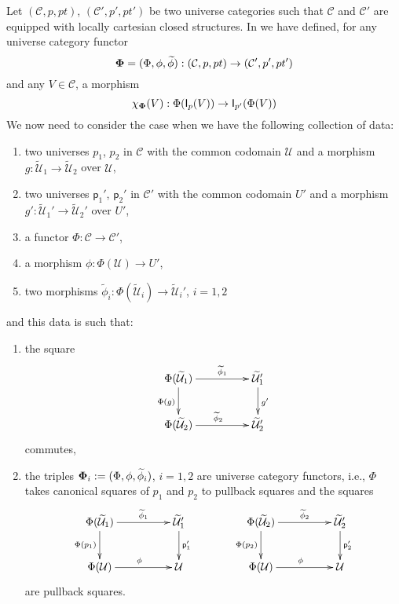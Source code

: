 \documentclass[12pt]{article}
\numberwithin{equation}{section}
\newcommand{\sr}{\rightarrow}
\newcommand{\wt}{\widetilde}
\newcommand{\spc}{{\,\,\,\,\,\,\,}}
\newcommand{\C}{{\mathcal C}}  %
\newcommand{\p}{\mathsf{p}}
\newcommand{\U}{\mathcal{U}}
\newcommand{\I}{\mathsf{I}}
\begin{document}
Let $({\C},p,pt)$, $({\C}',p',pt')$ be two universe categories
such that $\C$ and $\C'$ are equipped with locally cartesian
closed structures. In \cite[Construction 5.6]{fromunivwithPi} we have defined,
for any universe category functor
%
$${\bf\Phi}=(\Phi,\phi,\wt{\phi}):({\C},p,pt)\sr ({\mathcal
  C}',p',pt')$$
%
and any $V\in {\C}$, a morphism
%
$$\chi_{\bf\Phi}(V):\Phi(\I_p(V))\sr \I_{p'}(\Phi(V))$$
%
We now need to consider the case when we have the following collection of data:
%
\begin{enumerate}
\item two universes $p_1$, $p_2$ in $\C$ with the common codomain $\U$
  and a morphism $g:\wt{\U}_1\sr \wt{\U}_2$ over $\U$,
\item two universes $\p_1'$, $\p_2'$ in $\C'$ with the common codomain
  $U'$ and a morphism $g':\wt{\U}_1'\sr \wt{\U}_2'$ over $U'$,
\item a functor $\Phi:{\C}\sr {\C}'$,
\item a morphism $\phi:\Phi(\U)\sr U'$,
\item two morphisms $\wt{\phi}_i:\Phi(\wt{\U}_i)\sr \wt{\U}_i'$, $i=1,2$
\end{enumerate}
%
and this data is such that:
%
\begin{enumerate}
\item the square
%
$$
\begin{xy}
          \xymatrix@C=4pc{ \Phi(\wt{\U}_1) \ar[r]^-{\wt{\phi}_1}
            \ar[d]_{\Phi(g)} & \wt{\U}_1' \ar[d]^{g'}\\ \Phi(\wt{\U}_2)
            \ar[r]^{\wt{\phi}_2} & \wt{\U}_2' }
\end{xy}
$$
%
commutes,
%
\item the triples ${\bf\Phi}_i:=(\Phi,\phi,\wt{\phi}_i)$, $i=1,2$ are universe
  category functors, i.e.,  $\Phi$ takes canonical squares of $p_1$ and $p_2$ to
  pullback squares and the squares
%
$$
\begin{xy}
          \xymatrix@C=4pc{ \Phi(\wt{\U}_1) \ar[r]^-{\wt{\phi}_1}
            \ar[d]_{\Phi(p_1)} & \wt{\U}_1' \ar[d]^{\p_1'}\\ \Phi(\U)
            \ar[r]^{\phi} & \U }
\end{xy}
\spc\spc\spc
\begin{xy}
          \xymatrix@C=4pc{ \Phi(\wt{\U}_2) \ar[r]^-{\wt{\phi}_2}
            \ar[d]_{\Phi(p_2)} & \wt{\U}_2' \ar[d]^{\p_2'}\\ \Phi(\U)
            \ar[r]^{\phi} & \U }
\end{xy}
$$
%
are pullback squares.
\end{enumerate}
\end{document}
